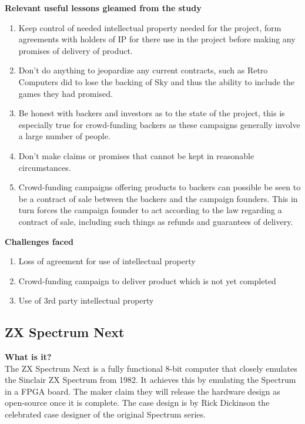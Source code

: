 \textbf{Relevant useful lessons gleamed from the study}
\begin{enumerate}
\item Keep control of needed intellectual property needed for the project, form agreements with holders of IP for there use in the project before making any promises of delivery of product. 
\item Don't do anything to jeopardize any current contracts, such as Retro Computers did to lose the backing of Sky and thus the ability to include the games they had promised.
\item Be honest with backers and investors as to the state of the project, this is especially true for crowd-funding backers as these campaigns generally involve a large number of people.
\item Don't make claims or promises that cannot be kept in reasonable circumstances.
\item Crowd-funding campaigns offering products to backers can possible be seen to be a contract of sale between the backers and the campaign founders. This in turn forces the campaign founder to act according to the law regarding a contract of sale, including such things as refunds and guarantees of delivery.
\end{enumerate}

\textbf{Challenges faced}
\begin{enumerate}
\item Loss of agreement for use of intellectual property
\item Crowd-funding campaign to deliver product which is not yet completed 
\item Use of 3rd party intellectual property 
\end{enumerate}

\subsection{ZX Spectrum Next}
\textbf{What is it?}\\
The ZX Spectrum Next is a fully functional 8-bit computer that closely emulates the Sinclair ZX Spectrum from 1982. It achieves this by emulating the Spectrum in a FPGA board. The maker claim they will release the hardware design as open-source once it is complete. The case design is by Rick Dickinson the celebrated case designer of the original Spectrum series.\\ 

